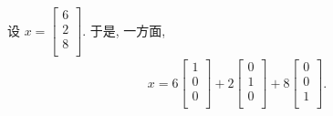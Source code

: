 \documentclass[../libro.tex]{subfiles}
\begin{document}
\begin{example}
    设
    \(
        x =
        \begin{bmatrix}
            6 \\ 2 \\ 8 \\
        \end{bmatrix}.
    \)
    于是, 一方面,
    \begin{align*}
        x =
        6
        \begin{bmatrix}
            1 \\ 0 \\ 0 \\
        \end{bmatrix}
        + 2
        \begin{bmatrix}
            0 \\ 1 \\ 0 \\
        \end{bmatrix}
        + 8
        \begin{bmatrix}
            0 \\ 0 \\ 1 \\
        \end{bmatrix}.
    \end{align*}


\end{example}
\end{document}
